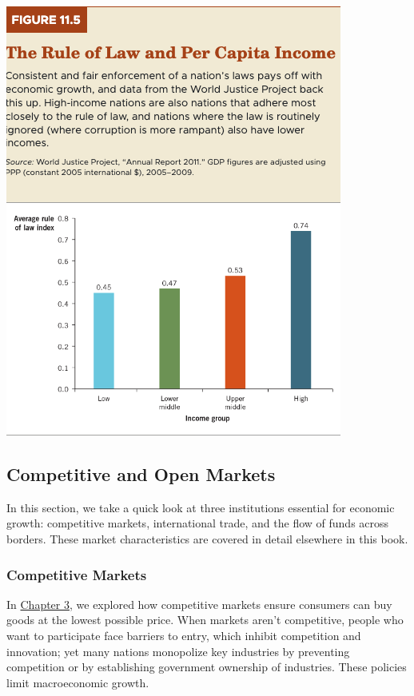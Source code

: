\documentclass[11pt]{article} %
\begin{document}
\begin{center}
\includegraphics[scale=0.5]{../../images/Chapter 11/Figure 11.5.png}
\end{center}

\subsection*{Competitive and Open Markets}

In this section, we take a quick look at three institutions essential for economic growth: competitive markets, international trade, and the flow of funds across borders. These market characteristics are covered in detail elsewhere in this book.

\subsubsection*{Competitive Markets}
In \underline{Chapter 3}, we explored how competitive markets ensure consumers can buy goods at the lowest possible price. When markets aren't competitive, people who want to participate face barriers to entry, which inhibit competition and innovation; yet many nations monopolize key industries by preventing competition or by establishing government ownership of industries. These policies limit macroeconomic growth.
\end{document}
